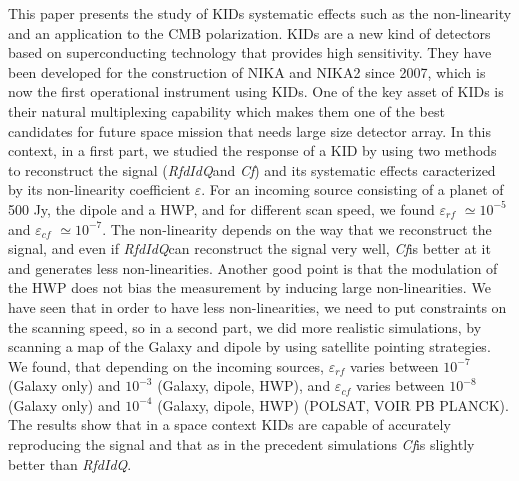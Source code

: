 \documentclass[twocolumn, traditabstract]{aa}
\newcommand{\eps}{$\varepsilon$}
\newcommand{\rf}{{\it RfdIdQ}}
\newcommand{\cf}{{\it Cf}}
\begin{document}
This paper presents the study of KIDs systematic effects such as the non-linearity and an application to the CMB polarization. 
KIDs are a new kind of detectors based on superconducting technology that provides high sensitivity. They have been developed for the construction of NIKA and NIKA2 since 2007, which is now the first operational instrument using KIDs. One of the key asset of KIDs is their natural multiplexing capability which makes them one of the best candidates for future space mission that needs large size detector array. In this context, in a first part, we studied the response of a KID by using two methods to reconstruct the signal (\rf and \cf) and its systematic effects caracterized by its non-linearity coefficient \eps. For an incoming source consisting of a planet of 500 Jy, the dipole and a HWP, and for different scan speed, we found $\varepsilon_{rf}$ $\simeq 10^{-5}$ and $\varepsilon_{cf}$ $\simeq 10^{-7}$. The non-linearity depends on the way that we reconstruct the signal, and even if \rf can reconstruct the signal very well, \cf is better at it and generates less non-linearities. Another good point is that the modulation of the HWP does not bias the measurement by inducing large non-linearities. We have seen that in order to have less non-linearities, we need to put constraints on the scanning speed, so in a second part, we did more realistic simulations, by scanning a map of the Galaxy and dipole by using satellite pointing strategies. We found, that depending on the incoming sources, $\varepsilon_{rf}$ varies between $10^{-7}$ (Galaxy only) and $10^{-3}$ (Galaxy, dipole, HWP), and $\varepsilon_{cf}$ varies between $10^{-8}$ (Galaxy only) and $10^{-4}$ (Galaxy, dipole, HWP) (POLSAT, VOIR PB PLANCK). The results show that in a space context KIDs are capable of accurately reproducing the signal and that as in the precedent simulations \cf is slightly better than \rf.\\
\end{document}
